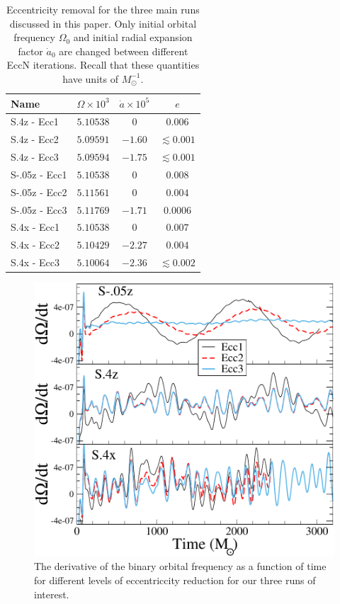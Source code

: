 \documentclass[aps,prd,amsmath,floatfix
,twocolumn
,superscriptaddress,nofootinbib,showpacs]{revtex4-1}
\theoremstyle{plain} \newtheorem{thm}{Theorem} \newtheorem{lem}{Lemma}
\begin{document}
\begin{table}
\begin{tabular} {l | l | c | c}
Name & $\Omega\times10^{3}$ & $\dot{a}\times10^{5}$ & $e$
\\ \hline S.4z - Ecc1 & $5.10538$ & $0$ & $0.006$ \\ S.4z - Ecc2 &
$5.09591$ & $-1.60$ & $\lesssim 0.001$ \\ S.4z - Ecc3 & $5.09594$ &
$-1.75$ & $\lesssim 0.001$ \\ \hline S-.05z - Ecc1 & $5.10538$ & $0$ &
$0.008$ \\ S-.05z - Ecc2 & $5.11561$ & $0$ & $0.004$ \\ S-.05z - Ecc3
& $5.11769$ & $-1.71$ & $0.0006$ \\\hline S.4x - Ecc1 & $5.10538$ &
$0$ & $0.007$ \\ S.4x - Ecc2 & $5.10429$ & $-2.27$ & $0.004$ \\ S.4x -
Ecc3 & $5.10064$ & $-2.36$ & $\lesssim 0.002$ \\
\end{tabular}
\caption{\label{tab:ecc_removal} Eccentricity removal for the three
  main runs discussed in this paper.  Only initial orbital frequency
  $\Omega_0$ and initial radial expansion factor $\dot a_0$ are
  changed between different EccN iterations. Recall that these
  quantities have units of $M_{\odot}^{-1}$.}
\end{table}

\begin{figure}
\includegraphics[width=0.95\columnwidth]{DOmegaVT}
\caption{{\label{fig:DOmegaVT}} The derivative of the binary orbital
  frequency as a function of time for different levels of
  eccentriccity reduction for our three runs of interest. }
\end{figure}
\end{document}
